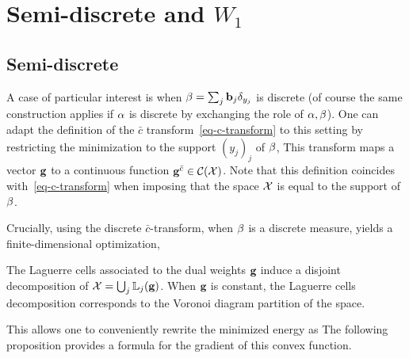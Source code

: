 
\section{Semi-discrete and $W_1$}

\subsection{Semi-discrete}

A case of particular interest is when $\beta = \sum_j \mathrm{\textbf{\upshape b}}_j \delta_{y_j}$ is discrete (of course the same construction applies if $\alpha$ is discrete by exchanging the role of $\alpha,\beta$).
%
One can adapt the definition of the $\bar c$ transform~\eqref{eq-c-transform} to this setting by restricting the minimization to the support $(y_j)_j$ of $\beta$,
This transform maps a vector $\mathrm{\textbf{\upshape g}}$ to a continuous function $\mathrm{\textbf{\upshape g}}^{\bar {c}} \in \mathcal{C}(\mathcal{X})$.
%
Note that this definition coincides with~\eqref{eq-c-transform} when imposing that the space $\mathcal{X}$ is equal to the support of $\beta$.

Crucially, using the discrete $\bar c$-transform, when $\beta$ is a discrete measure, yields a finite-dimensional optimization, 

The Laguerre cells associated to the dual weights $\mathrm{\textbf{\upshape g}}$
induce a disjoint decomposition of $\mathcal{X} = \bigcup_j \mathbb{L}_{j}(\mathrm{\textbf{\upshape g}})$. When $\mathrm{\textbf{\upshape g}}$ is constant, the Laguerre cells decomposition corresponds to the Voronoi diagram partition of the space. 
%

This allows one to conveniently rewrite the minimized energy as
The following proposition provides a formula for the gradient of this convex function.

